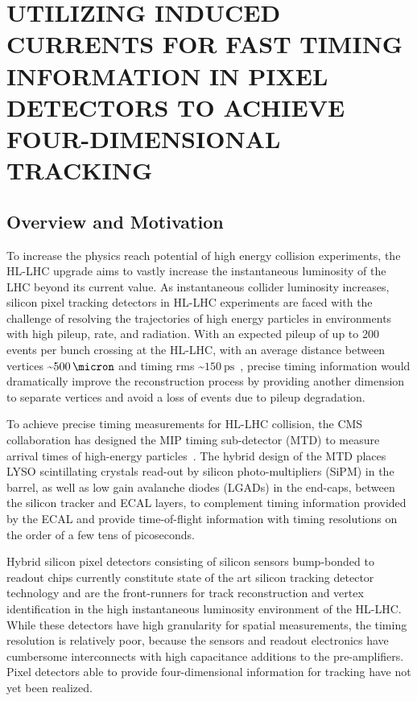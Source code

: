 
\chapter{UTILIZING INDUCED CURRENTS FOR FAST TIMING INFORMATION IN PIXEL DETECTORS TO ACHIEVE FOUR-DIMENSIONAL TRACKING}
\label{Fast_Timing}

\section{Overview and Motivation}
To increase the physics reach potential of high energy collision experiments, the HL-LHC upgrade aims to vastly increase the instantaneous luminosity of the LHC beyond its current value. 
As instantaneous collider luminosity increases, silicon pixel tracking detectors in HL-LHC experiments are faced with the challenge of resolving the trajectories of high energy particles in environments with high pileup, rate, and radiation.
With an expected pileup of up to 200 events per bunch crossing at the HL-LHC, with an average distance between vertices \sim$\SI{500}{\micron}$ and timing rms \sim$\SI{150}{\ps}$~\cite{CARTIGLIA201747}, precise timing information would dramatically improve the reconstruction process by providing another dimension to separate vertices and avoid a loss of events due to pileup degradation.

To achieve precise timing measurements for HL-LHC collision, the CMS collaboration has designed the MIP timing sub-detector (MTD) to measure arrival times of high-energy particles~\cite{CMS:2667167}.
The hybrid design of the MTD places LYSO scintillating crystals read-out by silicon photo-multipliers (SiPM) in the barrel, as well as low gain avalanche diodes (LGADs) in the end-caps, between the silicon tracker and ECAL layers, to complement timing information provided by the ECAL and provide time-of-flight information with timing resolutions on the order of a few tens of picoseconds.

Hybrid silicon pixel detectors consisting of silicon sensors bump-bonded to readout chips currently constitute state of the art silicon tracking detector technology and are the front-runners for track reconstruction and vertex identification in the high instantaneous luminosity environment of the HL-LHC.
While these detectors have high granularity for spatial measurements, the timing resolution is relatively poor, because the sensors and readout electronics have cumbersome interconnects with high capacitance additions to the pre-amplifiers. 
Pixel detectors able to provide four-dimensional information for tracking have not yet been realized.

